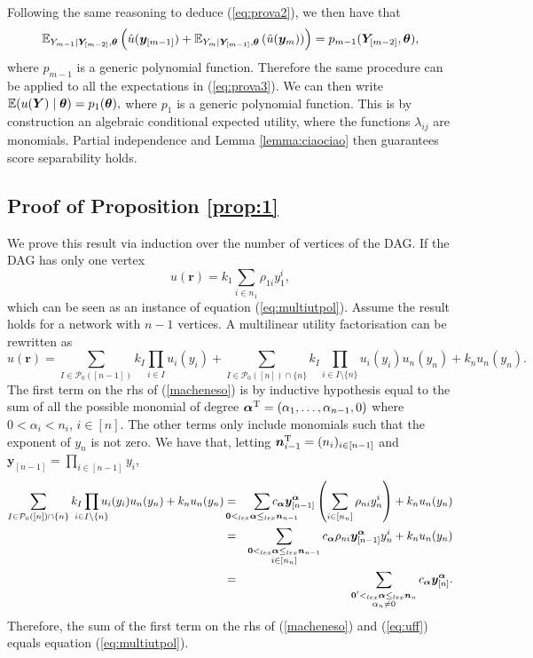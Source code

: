Following the same reasoning to deduce (\ref{eq:prova2}), we then have that 
\begin{equation*}
\mathbb{E}_{Y_{m-1}|\bm{Y}_{[m-2]},\bm{\theta}}\left(\hat{u}(\bm{y}_{[m-1]})+\mathbb{E}_{Y_m|\bm{Y}_{[m-1]},\bm{\theta}}\left(\hat{u}(\bm{y}_{m})\right)\right)=p_{m-1}(\bm{Y}_{[m-2]},\bm{\theta}),
\end{equation*}
where $p_{m-1}$ is a generic polynomial function. Therefore the same procedure can be applied to all the expectations in (\ref{eq:prova3}). We can then write
$
\mathbb{E}(u(\bm{Y})\;|\;\bm{\theta})=p_1(\bm{\theta}),
$ where $p_1$ is a generic polynomial function. This is by construction an algebraic conditional expected utility, where the functions $\lambda_{ij}$ are monomials. Partial independence and Lemma \ref{lemma:ciaociao} then guarantees score separability holds. 

\subsection{Proof of Proposition \ref{prop:1}}
\label{proof:basta}
We prove this result via induction over the number of vertices of the DAG. If the DAG has only one vertex 
\begin{equation*}
u(\bm{r})=k_1\sum_{i\in n_1}\rho_{1i}y_1^i,
\end{equation*}
which can be seen as an instance of equation (\ref{eq:multiutpol}). Assume the result holds for a network with $n-1$ vertices. A multilinear utility factorisation can be rewritten as
\begin{equation}
u(\bm{r})=\sum_{I\in\mathcal{P}_0([n-1])}k_I\prod_{i\in I}u_i(y_i)+\sum_{I\in\mathcal{P}_0([n])\cap\{n\}}k_I\prod_{i\in I\setminus\{n\}}u_i(y_i)u_n(y_n)+ k_nu_n(y_n).
\label{macheneso}
\end{equation}
The first term on the rhs of (\ref{macheneso}) is by inductive hypothesis equal to the sum of all the possible monomial of degree $\bm{\alpha}^{\textnormal{T}}=(\alpha_1,\dots,\alpha_{n-1},0)$ where $0<\alpha_i<n_i$, $i\in[n]$. The other terms only include monomials such that the exponent of $y_n$ is not zero. We have that, letting $\bm{n}_{i-1}^{\textnormal{T}}=(n_i)_{i\in[n-1]}$ and $\bm{y}_{[n-1]}=\prod_{i\in[n-1]}y_i$,
\begin{eqnarray}
\sum_{I\in\mathcal{P}_0([n])\cap\{n\}}k_I\prod_{\mathclap{i\in I\setminus \{n\}}}u_i(y_i)u_n(y_n)+k_nu_n(y_n)&=& \sum_{\mathclap{\bm{0}<_{lex}\bm{\alpha}\leq_{lex}\bm{n}_{n-1}}}c_{\bm{\alpha}}\bm{y}^{\bm{\alpha}}_{[n-1]}\left(\sum_{i\in [n_n]}\rho_{ni}y_n^i\right)+k_nu_n(y_n)\nonumber\\
&=&\sum_{\substack{\bm{0}<_{lex}\bm{\alpha}\leq_{lex}\bm{n}_{n-1}\\ i\in[n_n]}}c_{\bm{\alpha}}\rho_{ni}\bm{y}^{\bm{\alpha}}_{[n-1]}y_n^i+k_nu_n(y_n)\nonumber\\
&=&\sum_{\substack{\bm{0}'<_{lex}\bm{\alpha}\leq_{lex}\bm{n}_{n}\\ \alpha_n\neq 0}}c_{\bm{\alpha}}\bm{y}_{[n]}^{\bm{\alpha}}.\label{eq:uff}
\end{eqnarray}
Therefore, the sum of the first term on the rhs of (\ref{macheneso}) and (\ref{eq:uff}) equals equation (\ref{eq:multiutpol}).
